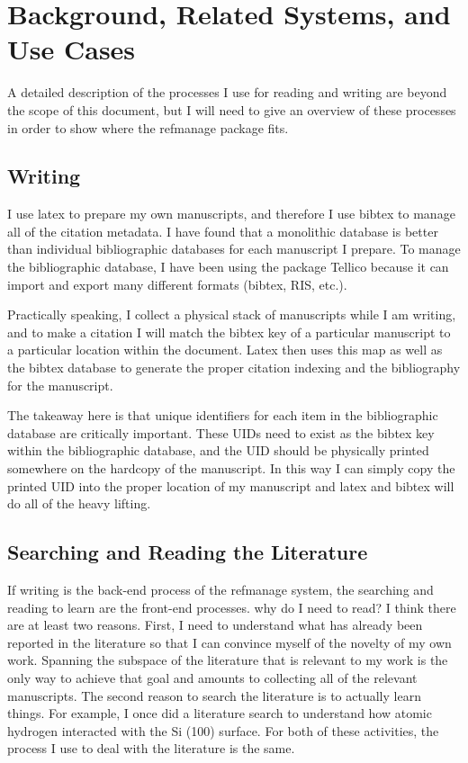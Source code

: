 \documentclass[letterpaper,12pt]{article}
\begin{document}
\section{Background, Related Systems, and Use Cases}
A detailed description of the processes I use for reading and writing are beyond the scope of this document, but I will need to give an overview of these processes in order to show where the refmanage package fits.

\subsection{Writing}
I use latex to prepare my own manuscripts, and therefore I use bibtex to manage all of the citation metadata. I have found that a monolithic database is better than individual bibliographic databases for each manuscript I prepare. To manage the bibliographic database, I have been using the package Tellico because it can import and export many different formats (bibtex, RIS, etc.).

Practically speaking, I collect a physical stack of manuscripts while I am writing, and to make a citation I will match the bibtex key of a particular manuscript to a particular location within the document. Latex then uses this map as well as the bibtex database to generate the proper citation indexing and the bibliography for the manuscript.

The takeaway here is that unique identifiers for each item in the bibliographic database are critically important. These UIDs need to exist as the bibtex key within the bibliographic database, and the UID should be physically printed somewhere on the hardcopy of the manuscript. In this way I can simply copy the printed UID into the proper location of my manuscript and latex and bibtex will do all of the heavy lifting.


\subsection{Searching and Reading the Literature}
If writing is the back-end process of the refmanage system, the searching and reading to learn are the front-end processes. why do I need to read? I think there are at least two reasons. First, I need to understand what has already been reported in the literature so that I can convince myself of the novelty of my own work. Spanning the subspace of the literature that is relevant to my work is the only way to achieve that goal and amounts to collecting all of the relevant manuscripts. The second reason to search the literature is to actually learn things. For example, I once did a literature search to understand how atomic hydrogen interacted with the Si (100) surface. For both of these activities, the process I use to deal with the literature is the same.
\end{document}
